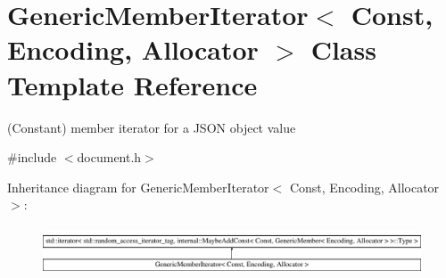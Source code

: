 \hypertarget{classGenericMemberIterator}{}\section{Generic\+Member\+Iterator$<$ Const, Encoding, Allocator $>$ Class Template Reference}
\label{classGenericMemberIterator}


(Constant) member iterator for a J\+S\+ON object value  




{\ttfamily \#include $<$document.\+h$>$}

Inheritance diagram for Generic\+Member\+Iterator$<$ Const, Encoding, Allocator $>$\+:\begin{figure}[H]
\begin{center}
\leavevmode
\includegraphics[height=1.462141cm]{classGenericMemberIterator}
\end{center}
\end{figure}
